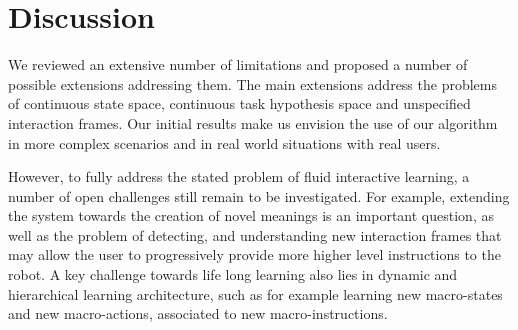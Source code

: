\section{Discussion}
\label{chapter:limitations:discussion}

We reviewed an extensive number of limitations and proposed a number of possible extensions addressing them. The main extensions address the problems of continuous state space, continuous task hypothesis space and unspecified interaction frames. Our initial results make us envision the use of our algorithm in more complex scenarios and in real world situations with real users.

However, to fully address the stated problem of fluid interactive learning, a number of open challenges still remain to be investigated. For example, extending the system towards the creation of novel meanings is an important question, as well as the problem of detecting, and understanding new interaction frames that may allow the user to progressively provide more higher level instructions to the robot. A key challenge towards life long learning also lies in dynamic and hierarchical learning architecture, such as for example learning new macro-states and new macro-actions, associated to new macro-instructions.
